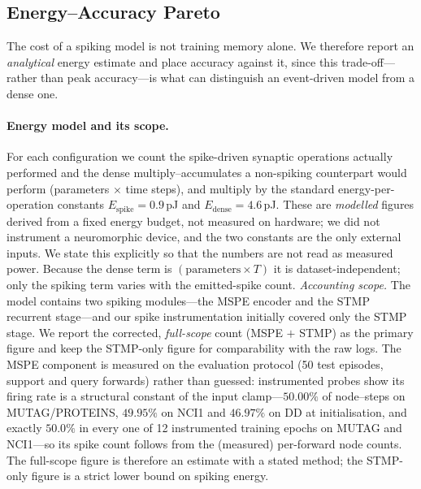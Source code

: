 \documentclass[a4paper,fleqn]{cas-dc}
\begin{document}
\subsection{Energy--Accuracy Pareto}
\label{sec:energy_pareto}

The cost of a spiking model is not training memory alone. We therefore report an \emph{analytical} energy estimate and place accuracy against it, since this trade-off---rather than peak accuracy---is what can distinguish an event-driven model from a dense one.

\paragraph{Energy model and its scope.} For each configuration we count the spike-driven synaptic operations actually performed and the dense multiply--accumulates a non-spiking counterpart would perform (parameters $\times$ time steps), and multiply by the standard energy-per-operation constants $E_{\text{spike}}{=}0.9$\,pJ and $E_{\text{dense}}{=}4.6$\,pJ. These are \emph{modelled} figures derived from a fixed energy budget, not measured on hardware; we did not instrument a neuromorphic device, and the two constants are the only external inputs. We state this explicitly so that the numbers are not read as measured power. Because the dense term is $(\text{parameters}\times T)$ it is dataset-independent; only the spiking term varies with the emitted-spike count. \emph{Accounting scope.} The model contains two spiking modules---the MSPE encoder and the STMP recurrent stage---and our spike instrumentation initially covered only the STMP stage. We report the corrected, \emph{full-scope} count (MSPE $+$ STMP) as the primary figure and keep the STMP-only figure for comparability with the raw logs. The MSPE component is measured on the evaluation protocol (50 test episodes, support and query forwards) rather than guessed: instrumented probes show its firing rate is a structural constant of the input clamp---$50.00\%$ of node--steps on MUTAG/PROTEINS, $49.95\%$ on NCI1 and $46.97\%$ on DD at initialisation, and exactly $50.0\%$ in every one of 12 instrumented training epochs on MUTAG and NCI1---so its spike count follows from the (measured) per-forward node counts. The full-scope figure is therefore an estimate with a stated method; the STMP-only figure is a strict lower bound on spiking energy.
\end{document}
